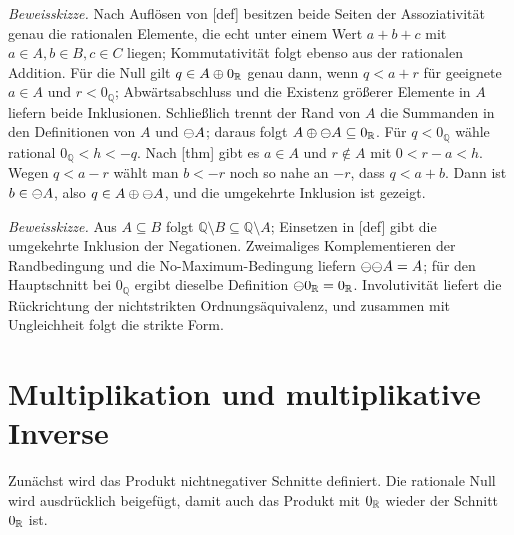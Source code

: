 \documentclass[main.tex]{subfiles}
\begin{document}
\emph{Beweisskizze.}
Nach Auflösen von [def] besitzen beide Seiten
der Assoziativität genau die rationalen Elemente, die echt unter einem Wert
\(a+b+c\) mit \(a\in A,b\in B,c\in C\) liegen; Kommutativität folgt ebenso
aus der rationalen Addition. Für die Null gilt
\(q\in A\mathbin{\oplus}0_{\mathbb R}\) genau dann, wenn \(q<a+r\) für geeignete
\(a\in A\) und \(r<0_{\mathbb Q}\); Abwärtsabschluss und die Existenz größerer
Elemente in \(A\) liefern beide Inklusionen. Schließlich trennt der Rand von
\(A\) die Summanden in den Definitionen von \(A\) und \(\mathop{\ominus}\!A\); daraus
folgt \(A\mathbin{\oplus}\mathop{\ominus}\!A\subseteq0_{\mathbb R}\). Für \(q<0_{\mathbb Q}\)
wähle rational \(0_{\mathbb Q}<h<-q\). Nach
[thm] gibt es
\(a\in A\) und \(r\notin A\) mit \(0<r-a<h\). Wegen \(q<a-r\) wählt man
\(b<-r\) noch so nahe an \(-r\), dass \(q<a+b\). Dann ist
\(b\in\mathop{\ominus}\!A\), also
\(q\in A\mathbin{\oplus}\mathop{\ominus}\!A\), und die umgekehrte Inklusion ist gezeigt.


\emph{Beweisskizze.}
Aus \(A\subseteq B\) folgt
\(\mathbb Q\setminus B\subseteq\mathbb Q\setminus A\); Einsetzen in
[def] gibt die umgekehrte Inklusion der
Negationen. Zweimaliges Komplementieren der Randbedingung und die
No-Maximum-Bedingung liefern \(\mathop{\ominus}\!\mathop{\ominus}\!A=A\); für den Hauptschnitt
bei \(0_{\mathbb Q}\) ergibt dieselbe Definition
\(\mathop{\ominus}\!0_{\mathbb R}=0_{\mathbb R}\). Involutivität liefert die Rückrichtung der
nichtstrikten Ordnungsäquivalenz, und zusammen mit Ungleichheit folgt die
strikte Form.

\section{Multiplikation und multiplikative Inverse}

Zunächst wird das Produkt nichtnegativer Schnitte definiert. Die rationale
Null wird ausdrücklich beigefügt, damit auch das Produkt mit
\(0_{\mathbb R}\) wieder der Schnitt \(0_{\mathbb R}\) ist.
\end{document}
